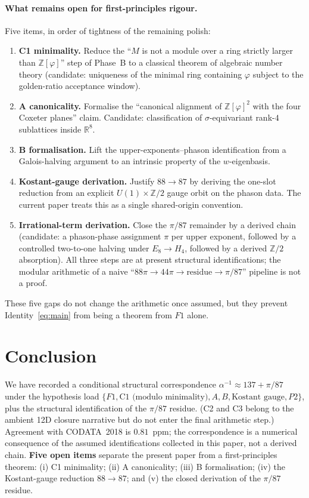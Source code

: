 \documentclass[12pt]{article}
\theoremstyle{definition}
\theoremstyle{remark}
\newcommand{\R}{\mathbb{R}}
\newcommand{\Z}{\mathbb{Z}}
\newcommand{\Zphi}{\mathbb{Z}[\varphi]}
\begin{document}
\paragraph{What remains open for first-principles rigour.} Five items, in order of tightness of the remaining polish:
\begin{enumerate}
  \item \textbf{C1 minimality.} Reduce the ``$M$ is not a module over a ring strictly larger than $\Zphi$'' step of Phase~B to a classical theorem of algebraic number theory (candidate: uniqueness of the minimal ring containing $\varphi$ subject to the golden-ratio acceptance window).
  \item \textbf{A canonicality.} Formalise the ``canonical alignment of $\Zphi^2$ with the four Coxeter planes'' claim. Candidate: classification of $\sigma$-equivariant rank-$4$ sublattices inside $\R^8$.
  \item \textbf{B formalisation.} Lift the upper-exponents--phason identification from a Galois-halving argument to an intrinsic property of the $w$-eigenbasis.
  \item \textbf{Kostant-gauge derivation.} Justify $88 \to 87$ by deriving the one-slot reduction from an explicit $U(1) \times \Z/2$ gauge orbit on the phason data. The current paper treats this as a single shared-origin convention.
  \item \textbf{Irrational-term derivation.} Close the $\pi/87$ remainder by a derived chain (candidate: a phason-phase assignment $\pi$ per upper exponent, followed by a controlled two-to-one halving under $E_8 \to H_4$, followed by a derived $\Z/2$ absorption). All three steps are at present structural identifications; the modular arithmetic of a naive ``$88 \pi \to 44 \pi \to \text{residue} \to \pi/87$'' pipeline is not a proof.
\end{enumerate}
These five gaps do not change the arithmetic once assumed, but they prevent Identity~\eqref{eq:main} from being a theorem from $F1$ alone.

\section{Conclusion}

We have recorded a conditional structural correspondence $\alpha^{-1} \approx 137 + \pi/87$ under the hypothesis load $\{F1, \text{C1 (modulo minimality)}, A, B, \text{Kostant gauge}, P2\}$, plus the structural identification of the $\pi/87$ residue. (C2 and C3 belong to the ambient 12D closure narrative but do not enter the final arithmetic step.) Agreement with CODATA~2018 is $0.81$~ppm; the correspondence is a numerical consequence of the assumed identifications collected in this paper, not a derived chain. \textbf{Five open items} separate the present paper from a first-principles theorem: (i) C1 minimality; (ii) A canonicality; (iii) B formalisation; (iv) the Kostant-gauge reduction $88 \to 87$; and (v) the closed derivation of the $\pi/87$ residue.
\end{document}
